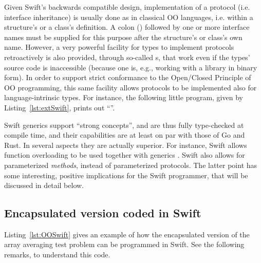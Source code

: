 \documentclass[11pt,oneside]{report}
\newcommand{\code}[1]{{\selectfont\ttfamily{#1}}}
\begin{document}
Given Swift's backwards compatible design, implementation of a
protocol (i.e. interface inheritance) is usually done as in classical
OO languages, i.e. within a structure's or a class's definition. A
colon (\code{:}) followed by one or more interface names must be
supplied for this purpose after the structure's or class's own
name. However, a very powerful facility for types to implement
protocols retroactively is also provided, through so-called
\code{extension}s, that work even if the types' source code is
inaccessible (because one is, e.g., working with a library in binary
form). In order to support strict conformance to the Open/Closed
Principle of OO programming, this same facility allows protocols to be
implemented also for language-intrinsic types. For instance, the
following little program, given by Listing~\ref{lst:extSwift}, prints
out ``\code{I am 4.9}''.


Swift generics support ``strong concepts'', and are thus fully
type-checked at compile time, and their capabilities are at least on
par with those of Go and Rust. In several aspects they are
actually superior. For instance, Swift allows function overloading to
be used together with generics \cite{Swift_Generics,Lyon}. Swift also
allows for parameterized \emph{methods}, instead of parameterized
protocols. The latter point has some interesting, positive
implications for the Swift programmer, that will be discussed in
detail below.

\subsection{Encapsulated version coded in Swift}

Listing~\ref{lst:OOSwift} gives an example of how the encapsulated
version of the array averaging test problem can be programmed in
Swift. See the following remarks, to understand this code.
\end{document}
